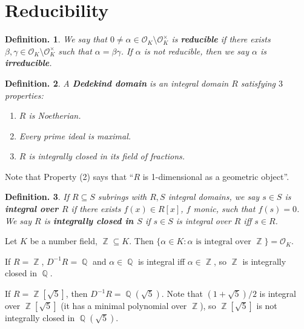 \documentclass[11pt, a4paper]{memoir}
\DeclareMathOperator{\Q}{{\mathbb{Q}}}
\DeclareMathOperator{\Z}{{\mathbb{Z}}}
\theoremstyle{change}
\theoremstyle{plain}
\theoremstyle{nonumberplain}
\newtheorem{definition}{Definition.}
\begin{document}
\section{Reducibility}
\begin{definition}
    We say that $0\neq\alpha\in\mathcal{O}_K\setminus \mathcal{O}_K^\times$ is \textbf{reducible} if there exists $\beta,\gamma\in\mathcal{O}_K\setminus\mathcal{O}_K^\times$ such that $\alpha=\beta\gamma$.
    If $\alpha$ is not reducible, then we say $\alpha$ is \textbf{irreducible}.
\end{definition}
\begin{definition}
    A \textbf{Dedekind domain} is an integral domain $R$ satisfying $3$ properties:
    \begin{enumerate}[nolistsep]
        \item $R$ is Noetherian.
        \item Every prime ideal is maximal.
        \item $R$ is integrally closed in its field of fractions.
    \end{enumerate}
\end{definition}
Note that Property (2) says that ``$R$ is 1-dimensional as a geometric object''.
\begin{definition}
    If $R\subseteq S$ subrings with $R,S$ integral domains, we say $s\in S$ is \textbf{integral over $R$} if there exists $f(x)\in R[x]$, $f$ monic, such that $f(s)=0$.
    We say $R$ is \textbf{integrally closed in $S$} if $s\in S$ is integral over $R$ iff $s\in R$.
\end{definition}
Let $K$ be a number field, $\Z\subseteq K$.
Then $\{\alpha\in K:\alpha\text{ is integral over }\Z\}=\mathcal{O}_K$.

If $R=\Z$, $D^{-1}R=\Q$ and $\alpha\in\Q$ is integral iff $\alpha\in\Z$, so $\Z$ is integrally closed in $\Q$.

If $R=\Z[\sqrt{5}]$, then $D^{-1}R=\Q(\sqrt{5})$.
Note that $(1+\sqrt{5})/2$ is integral over $\Z[\sqrt{5}]$ (it has a minimal polynomial over $\Z$), so $\Z[\sqrt{5}]$ is not integrally closed in $\Q(\sqrt{5})$.
\end{document}
